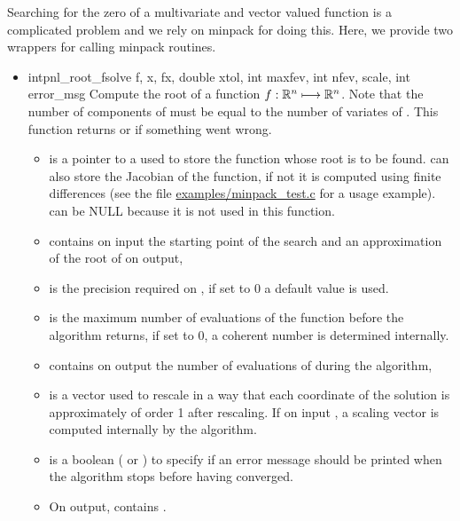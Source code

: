 Searching for the zero of a multivariate and vector valued function is a
complicated problem and we rely on minpack for doing this. Here, we provide
two wrappers for calling minpack routines.
\begin{itemize}
\item \describefun
  {int}{pnl_root_fsolve}{ \ptr f,
     \ptr x,  \ptr fx, double xtol,
    int maxfev, int \ptr nfev,  \ptr scale, int
    error_msg}
  \sshortdescribe Compute the root of a function $f:{\mathbb R}^n \longmapsto
  {\mathbb R}^n$. Note that the number of components of  must be equal to the
  number of variates of . This function returns  or
   if something went wrong.
  \parameters
  \begin{itemize}
  \item {} is a pointer to a  used to
    store the function whose root is to be found.  can also
    store the Jacobian of the function, if not it is computed using
    finite differences (see the file \url{examples/minpack_test.c} for
    a usage example).  can be NULL because it is
    not used in this function.
  \item  {} contains on input the starting point of the search and
    an approximation of the root of  on output,
  \item {} is the precision required on , if set to 0 a
    default value is used.
  \item {} is the maximum number of evaluations of the function
     before the algorithm returns, if set to 0, a coherent
    number is determined internally.
  \item {} contains on output the number of evaluations of
     during the algorithm,
  \item {} is a vector used to rescale  in a way that
    each coordinate of the solution is approximately of order 1 after
    rescaling. If on input , a scaling vector is
    computed internally by the algorithm.
  \item {} is a boolean
    ( or ) to specify if an error message should be
    printed when the algorithm stops before having converged.
  \item On output,  contains .
  \end{itemize}


\end{itemize}
